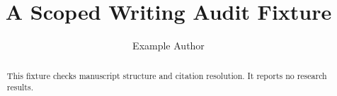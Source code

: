 \documentclass[manuscript,screen,nonacm]{acmart}
\title{A Scoped Writing Audit Fixture}
\author{Example Author}
\affiliation{\institution{Example University}\city{Example City}\country{Example Country}}
\begin{document}
\begin{abstract}
This fixture checks manuscript structure and citation resolution. It reports no research results.
\end{abstract}
\maketitle




\end{document}
